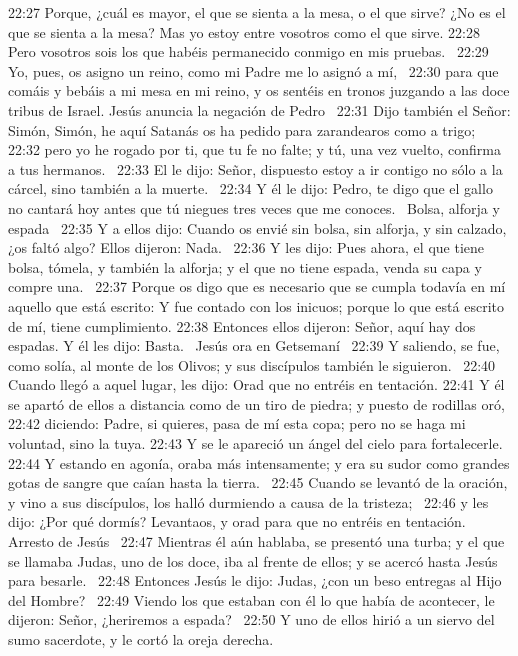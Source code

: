 22:27 Porque, ¿cuál es mayor, el que se sienta a la mesa, o el que sirve? ¿No es el que se sienta a la mesa? Mas yo estoy entre vosotros como el que sirve. 
22:28 Pero vosotros sois los que habéis permanecido conmigo en mis pruebas.  
22:29 Yo, pues, os asigno un reino, como mi Padre me lo asignó a mí,  
22:30 para que comáis y bebáis a mi mesa en mi reino, y os sentéis en tronos juzgando a las doce tribus de Israel. 
Jesús anuncia la negación de Pedro  
22:31 Dijo también el Señor: Simón, Simón, he aquí Satanás os ha pedido para zarandearos como a trigo;  
22:32 pero yo he rogado por ti, que tu fe no falte; y tú, una vez vuelto, confirma a tus hermanos.  
22:33 El le dijo: Señor, dispuesto estoy a ir contigo no sólo a la cárcel, sino también a la muerte.  
22:34 Y él le dijo: Pedro, te digo que el gallo no cantará hoy antes que tú niegues tres veces que me conoces.  
Bolsa, alforja y espada  
22:35 Y a ellos dijo: Cuando os envié sin bolsa, sin alforja, y sin calzado, ¿os faltó algo? Ellos dijeron: Nada.  
22:36 Y les dijo: Pues ahora, el que tiene bolsa, tómela, y también la alforja; y el que no tiene espada, venda su capa y compre una.  
22:37 Porque os digo que es necesario que se cumpla todavía en mí aquello que está escrito: Y fue contado con los inicuos; porque lo que está escrito de mí, tiene cumplimiento. 
22:38 Entonces ellos dijeron: Señor, aquí hay dos espadas. Y él les dijo: Basta.  
Jesús ora en Getsemaní  
22:39 Y saliendo, se fue, como solía, al monte de los Olivos; y sus discípulos también le siguieron.  
22:40 Cuando llegó a aquel lugar, les dijo: Orad que no entréis en tentación. 
22:41 Y él se apartó de ellos a distancia como de un tiro de piedra; y puesto de rodillas oró,  
22:42 diciendo: Padre, si quieres, pasa de mí esta copa; pero no se haga mi voluntad, sino la tuya. 
22:43 Y se le apareció un ángel del cielo para fortalecerle.  
22:44 Y estando en agonía, oraba más intensamente; y era su sudor como grandes gotas de sangre que caían hasta la tierra.  
22:45 Cuando se levantó de la oración, y vino a sus discípulos, los halló durmiendo a causa de la tristeza;  
22:46 y les dijo: ¿Por qué dormís? Levantaos, y orad para que no entréis en tentación.  
Arresto de Jesús   
22:47 Mientras él aún hablaba, se presentó una turba; y el que se llamaba Judas, uno de los doce, iba al frente de ellos; y se acercó hasta Jesús para besarle.  
22:48 Entonces Jesús le dijo: Judas, ¿con un beso entregas al Hijo del Hombre?  
22:49 Viendo los que estaban con él lo que había de acontecer, le dijeron: Señor, ¿heriremos a espada?  
22:50 Y uno de ellos hirió a un siervo del sumo sacerdote, y le cortó la oreja derecha.  
